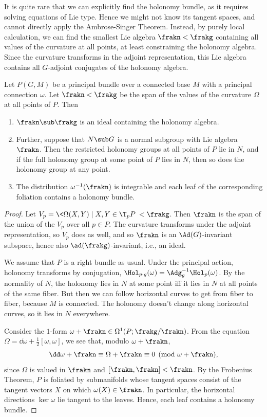 It is quite rare that we can explicitly find the holonomy bundle, as it requires solving equations of Lie type. Hence we might not know its tangent spaces, and cannot directly apply the Ambrose-Singer Theorem. Instead, by purely local calculation, we can find the smallest Lie algebra $\frakn< \frakg$ containing all values of the curvature at all points, at least constraining the holonomy algebra. Since the curvature transforms in the adjoint representation, this Lie algebra contains all $G$-adjoint conjugates of the holonomy algebra.

\begin{thm}\label{thm 16.26 McKay}
    Let $P(G,M)$ be a principal bundle over a connected base $M$ with a principal connection $\omega$. Let $\frakn<\frakg$ be the span of the values of the curvature $\Omega$ at all points of $P$. Then 
    \begin{enumerate}
        \item $\frakn\sub \frakg$ is an ideal containing the holonomy algebra. 
        \item Further, suppose that $N\sub G$ is a normal subgroup with Lie algebra $\frakn$. Then the restricted holonomy groups at all points of $P$ lie in $N$, and if the full holonomy group at some point of $P$ lies in $N$, then so does the holonomy group at any point.
        \item The distribution $\omega^{-1}(\frakn)$ is integrable and each leaf of the corresponding foliation contains a holonomy bundle.
    \end{enumerate}
\end{thm}
\begin{proof}
    Let $V_{p}=\<\Omega(X,Y)\mid X,Y\in\T_{p}P\><\frakg$. Then $\frakn$ is the span of the union of the $V_{p}$ over all $p\in P$. The curvature transforms under the adjoint representation, so $V_p$ does as well, and so $\frakn$ is an $\Ad(G)$-invariant subspace, hence also $\ad(\frakg)$-invariant, i.e., an ideal. 

    We assume that $P$ is a right bundle as usual. Under the principal action, holonomy transforms by conjugation, $\Hol_{p\cdot g}(\omega)=\Adg_g^{-1}\Hol_p(\omega)$. By the normality of $N$, the holonomy lies in $N$ at some point iff it lies in $N$ at all points of the same fiber. But then we can follow horizontal curves to get from fiber to fiber, because $M$ is connected. The holonomy doesn't change along horizontal curves, so it lies in $N$ everywhere.

    Consider the $1$-form $\omega+\frakn\in\Omega^1(P;\frakg\slash\frakn)$. From the equation $\Omega=\dd\omega+\frac12[\omega,\omega]$, we see that, modulo $\omega+\frakn$,
    \[\dd\omega+\frakn\equiv \Omega+\frakn\equiv 0\pmod{\omega+\frakn},\]
    since $\Omega$ is valued in $\frakn$ and $[\frakn,\frakn]<\frakn$. By the Frobenius Theorem, $P$ is foliated by submanifolds whose tangent spaces consist of the tangent vectors $X$ on which $\omega(X)\in\frakn$. In particular, the horizontal directions $\ker\omega$ lie tangent to the leaves. Hence, each leaf contains a holonomy bundle.
\end{proof}

